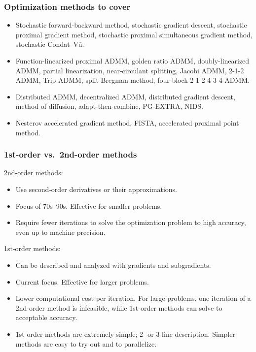 \documentclass[10pt,mathserif]{beamer}
\begin{document}
\begin{frame}
\frametitle{Optimization methods to cover}
\begin{itemize}
\item[\S7]
Stochastic forward-backward method,
stochastic gradient descent,
stochastic proximal gradient method,
stochastic proximal simultaneous gradient method,
stochastic Condat--V\~u.
\item[\S8]
Function-linearized proximal ADMM,
golden ratio ADMM, 
doubly-linearized ADMM,
partial linearization,
near-circulant splitting,
Jacobi ADMM,
2-1-2 ADMM,
Trip-ADMM,
split Bregman method,
four-block 2-1-2-4-3-4 ADMM.
\item[\S11] 
Distributed ADMM, decentralized ADMM, distributed gradient descent, method of diffusion, adapt-then-combine, PG-EXTRA, NIDS.
\item[\S12]
Nesterov accelerated gradient method, 
FISTA,
accelerated proximal point method.
\end{itemize}
\end{frame}




\begin{frame}
\frametitle{1st-order vs.\ 2nd-order methods}
2nd-order methods:
\begin{itemize}
\item 
Use second-order derivatives or their approximations.
\item
Focus of 70s--90s. Effective for smaller problems.
\item
Require fewer iterations to solve the optimization problem to high accuracy, even up to machine precision.
\end{itemize}

1st-order methods:
\begin{itemize}
\item 
Can be described and analyzed with gradients and subgradients.
\item
Current focus. Effective for larger problems.
\item
Lower computational cost per iteration.
For large problems, one iteration of a 2nd-order method is infeasible, while 1st-order methods can solve to acceptable accuracy.
\item
1st-order methods are extremely simple; 2- or 3-line description.
Simpler methods are easy to try out and to parallelize.
\end{itemize}

\end{frame}
\end{document}
